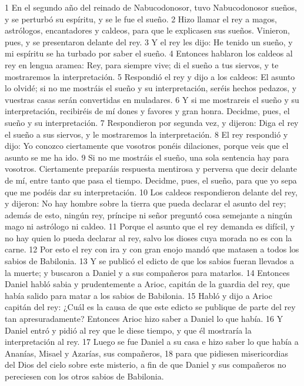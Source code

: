 1 En el segundo año del reinado de Nabucodonosor, tuvo Nabucodonosor sueños, y se perturbó su espíritu, y se le fue el sueño.
2 Hizo llamar el rey a magos, astrólogos, encantadores y caldeos, para que le explicasen sus sueños. Vinieron, pues, y se presentaron delante del rey.
3 Y el rey les dijo: He tenido un sueño, y mi espíritu se ha turbado por saber el sueño.
4 Entonces hablaron los caldeos al rey en lengua aramea: Rey, para siempre vive; di el sueño a tus siervos, y te mostraremos la interpretación.
5 Respondió el rey y dijo a los caldeos: El asunto lo olvidé; si no me mostráis el sueño y su interpretación, seréis hechos pedazos, y vuestras casas serán convertidas en muladares.
6 Y si me mostrareis el sueño y su interpretación, recibiréis de mí dones y favores y gran honra. Decidme, pues, el sueño y su interpretación.
7 Respondieron por segunda vez, y dijeron: Diga el rey el sueño a sus siervos, y le mostraremos la interpretación.
8 El rey respondió y dijo: Yo conozco ciertamente que vosotros ponéis dilaciones, porque veis que el asunto se me ha ido.
9 Si no me mostráis el sueño, una sola sentencia hay para vosotros. Ciertamente preparáis respuesta mentirosa y perversa que decir delante de mí, entre tanto que pasa el tiempo. Decidme, pues, el sueño, para que yo sepa que me podéis dar su interpretación.
10 Los caldeos respondieron delante del rey, y dijeron: No hay hombre sobre la tierra que pueda declarar el asunto del rey; además de esto, ningún rey, príncipe ni señor preguntó cosa semejante a ningún mago ni astrólogo ni caldeo.
11 Porque el asunto que el rey demanda es difícil, y no hay quien lo pueda declarar al rey, salvo los dioses cuya morada no es con la carne.
12 Por esto el rey con ira y con gran enojo mandó que matasen a todos los sabios de Babilonia.
13 Y se publicó el edicto de que los sabios fueran llevados a la muerte; y buscaron a Daniel y a sus compañeros para matarlos.
14 Entonces Daniel habló sabia y prudentemente a Arioc, capitán de la guardia del rey, que había salido para matar a los sabios de Babilonia.
15 Habló y dijo a Arioc capitán del rey: ¿Cuál es la causa de que este edicto se publique de parte del rey tan apresuradamente? Entonces Arioc hizo saber a Daniel lo que había.
16 Y Daniel entró y pidió al rey que le diese tiempo, y que él mostraría la interpretación al rey.
17 Luego se fue Daniel a su casa e hizo saber lo que había a Ananías, Misael y Azarías, sus compañeros,
18 para que pidiesen misericordias del Dios del cielo sobre este misterio, a fin de que Daniel y sus compañeros no pereciesen con los otros sabios de Babilonia.
